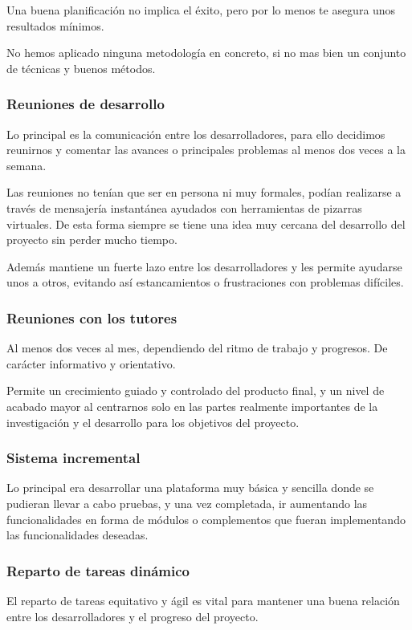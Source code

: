 Una buena planificación no implica el éxito, pero por lo menos te asegura unos
resultados mínimos.

No hemos aplicado ninguna metodología en concreto, si no mas bien un conjunto
de técnicas y buenos métodos.

\subsubsection*{Reuniones de desarrollo}
Lo principal es la comunicación entre los desarrolladores, para ello decidimos
reunirnos y comentar las avances o principales problemas al menos dos veces a
la semana.

Las reuniones no tenían que ser en persona ni muy formales, podían realizarse a
través de mensajería instantánea ayudados con herramientas de pizarras
virtuales. De
esta forma siempre se tiene una idea muy cercana del desarrollo del proyecto sin
perder mucho tiempo.

Además mantiene un fuerte lazo entre los desarrolladores y les permite ayudarse
unos a otros, evitando así estancamientos o frustraciones con problemas
difíciles.
\subsubsection*{Reuniones con los tutores}
Al menos dos veces al mes, dependiendo del ritmo de trabajo y progresos. De
carácter informativo y orientativo.

Permite un crecimiento guiado y controlado del producto final, y un nivel de
acabado mayor al centrarnos solo en las partes realmente importantes de la
investigación y el desarrollo para los objetivos del proyecto.

\subsubsection*{Sistema incremental}
Lo principal era desarrollar una plataforma muy básica y sencilla donde se
pudieran llevar a cabo pruebas, y una vez completada, ir aumentando las
funcionalidades en forma de módulos o complementos que fueran implementando las
funcionalidades deseadas.

\subsubsection*{Reparto de tareas dinámico} %
El reparto de tareas equitativo y ágil es vital para mantener una buena
relación entre los desarrolladores y el progreso del proyecto.


